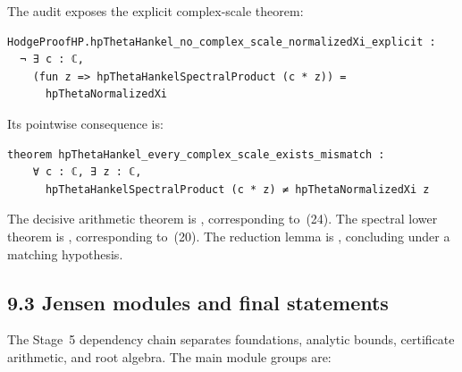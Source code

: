 \documentclass[
  11pt,
]{article}
\begin{document}
The audit exposes the explicit complex-scale theorem:

\begin{verbatim}
HodgeProofHP.hpThetaHankel_no_complex_scale_normalizedXi_explicit :
  ¬ ∃ c : ℂ,
    (fun z => hpThetaHankelSpectralProduct (c * z)) =
      hpThetaNormalizedXi
\end{verbatim}

Its pointwise consequence is:

\begin{verbatim}
theorem hpThetaHankel_every_complex_scale_exists_mismatch :
    ∀ c : ℂ, ∃ z : ℂ,
      hpThetaHankelSpectralProduct (c * z) ≠ hpThetaNormalizedXi z
\end{verbatim}

The decisive arithmetic theorem is \texttt{}, corresponding to~(24). The spectral lower theorem is \texttt{}, corresponding to~(20). The reduction lemma is \texttt{}, concluding \texttt{} under a matching hypothesis.

\hypertarget{jensen-modules-and-final-statements}{%
\subsection{9.3 Jensen modules and final statements}\label{jensen-modules-and-final-statements}}

The Stage~5 dependency chain separates foundations, analytic bounds, certificate arithmetic, and root algebra. The main module groups are:
\end{document}
